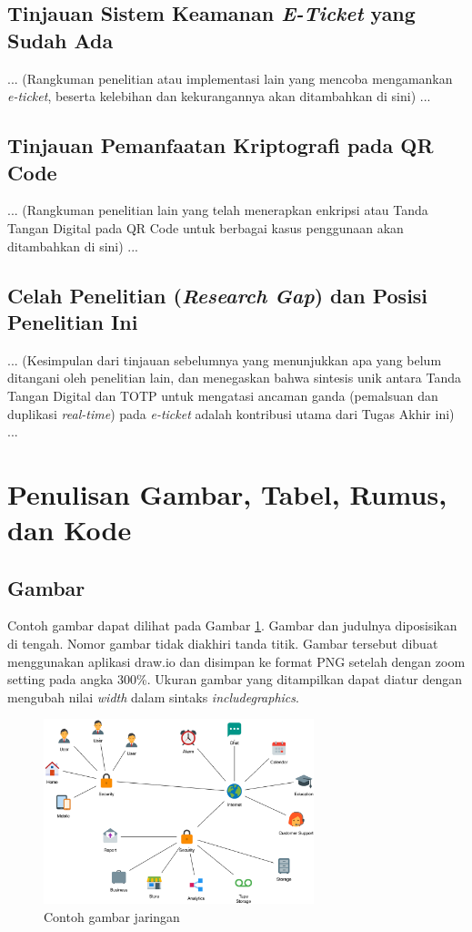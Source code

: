 \subsection{Tinjauan Sistem Keamanan \textit{E-Ticket} yang Sudah Ada}
... (Rangkuman penelitian atau implementasi lain yang mencoba mengamankan \textit{e-ticket}, beserta kelebihan dan kekurangannya akan ditambahkan di sini) ...

\subsection{Tinjauan Pemanfaatan Kriptografi pada QR Code}
... (Rangkuman penelitian lain yang telah menerapkan enkripsi atau Tanda Tangan Digital pada QR Code untuk berbagai kasus penggunaan akan ditambahkan di sini) ...

\subsection{Celah Penelitian (\textit{Research Gap}) dan Posisi Penelitian Ini}
... (Kesimpulan dari tinjauan sebelumnya yang menunjukkan apa yang belum ditangani oleh penelitian lain, dan menegaskan bahwa sintesis unik antara Tanda Tangan Digital dan TOTP untuk mengatasi ancaman ganda (pemalsuan dan duplikasi \textit{real-time}) pada \textit{e-ticket} adalah kontribusi utama dari Tugas Akhir ini) ...

\section{Penulisan Gambar, Tabel, Rumus, dan Kode}
\lipsum[1]

\subsection{Gambar}
Contoh gambar dapat dilihat pada Gambar \ref{gambar:jaringan}. Gambar dan judulnya diposisikan di tengah. Nomor gambar tidak diakhiri tanda titik. Gambar tersebut dibuat menggunakan aplikasi draw.io dan disimpan ke format PNG setelah dengan zoom setting pada angka 300\%. Ukuran gambar yang ditampilkan dapat diatur dengan mengubah nilai \textit{width} dalam sintaks \textit{includegraphics}.

\begin{figure}[t] %
	\centering
  \captionsetup{justification=centering}
    	\includegraphics[width=0.7\textwidth]{image/gambar1.png}
	\caption{Contoh gambar jaringan}
	\label{gambar:jaringan}
\end{figure}

